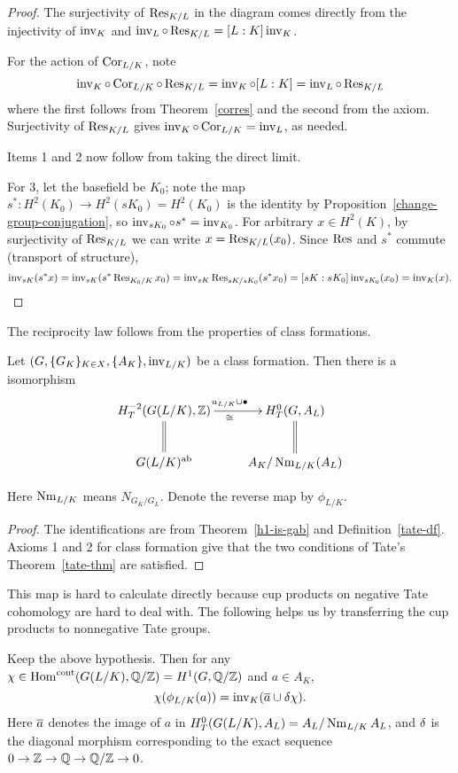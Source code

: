 \begin{proof}
The surjectivity of $\operatorname{Res}_{K/L}$ in the diagram comes directly from the injectivity of $\operatorname{inv}_K$ and $\operatorname{inv}_L\circ \operatorname{Res}_{K/L}=[L:K]\operatorname{inv}_K$.

For the action of $\operatorname{Cor}_{L/K}$, note
\[
\operatorname{inv}_K\circ \operatorname{Cor}_{L/K}\circ\operatorname{Res}_{K/L}=\operatorname{inv}_K\circ[L:K] =\operatorname{inv}_L\circ \operatorname{Res}_{K/L}
\]
where the first follows from Theorem~\ref{corres} and the second from the axiom. Surjectivity of $\operatorname{Res}_{K/L}$ gives $\operatorname{inv}_K\circ \operatorname{Cor}_{L/K}=\operatorname{inv}_L$, as needed.

Items 1 and 2 now follow from taking the direct limit.

For 3, let the basefield be $K_0$; note the map $s^*:H^2(K_0)\to H^2(sK_0)=H^2(K_0)$ is the identity by Proposition~\ref{change-group-conjugation}, so $\operatorname{inv}_{sK_0}\circ s^*=\operatorname{inv}_{K_0}$. For arbitrary $x\in H^2(K)$, by surjectivity of $\operatorname{Res}_{K/L}$ we can write $x=\operatorname{Res}_{K/L}(x_0)$. Since $\operatorname{Res}$ and $s^*$ commute (transport of structure),
\[
\operatorname{inv}_{sK}(s^*x)=\operatorname{inv}_{sK} (s^*\operatorname{Res}_{K_0/K}x_0)
=\operatorname{inv}_{sK} \operatorname{Res}_{sK/sK_0}(s^*x_0)
=[sK:sK_0] \operatorname{inv}_{sK_0}(x_0)=\operatorname{inv}_K(x).
\]
\end{proof}
The reciprocity law follows from the properties of class formations.
\begin{thm}
Let $(G, \{G_K\}_{K\in X}, \{A_K\},\operatorname{inv}_{L/K})$ be a class formation. Then there is a isomorphism
\[
\xymatrix{
H_T^{-2}(G(L/K),\Z)\ar[r]^{u_{L/K}\cup \bullet}_{\cong}\ar@{=}[d] & H_T^0(G,A_L)\ar@{=}[d]\\
G(L/K)^\text{ab}& A_K/\nm_{L/K}(A_L)}
\]
\end{thm}
Here $\operatorname{Nm}_{L/K}$ means $N_{G_K/G_L}$. Denote the reverse map by $\phi_{L/K}$.
\begin{proof}
The identifications are from Theorem~\ref{h1-is-gab} and Definition~\ref{tate-df}. Axioms 1 and 2 for class formation give that the two conditions of Tate's Theorem~\ref{tate-thm} are satisfied.
\end{proof}
This map is hard to calculate directly because cup products on negative Tate cohomology are hard to deal with. 
The following helps us by transferring the cup products to nonnegative Tate groups.
\begin{thm}
Keep the above hypothesis. Then for any $\chi\in \operatorname{Hom}^{\text{cont}}(G(L/K),\mathbb{Q}/\mathbb{Z})=H^1(G,\mathbb{Q}/\mathbb{Z})$ and $a\in A_K$,
\[
\chi(\phi_{L/K}(a))=\operatorname{inv}_K(\overline{a}\cup \delta \chi).
\]
Here $\overline{a}$ denotes the image of $a$ in $H_T^{0}(G(L/K),A_L)=A_L/\operatorname{Nm}_{L/K}A_L$, and $\delta$ is the diagonal morphism corresponding to the exact sequence $0\to \mathbb{Z}\to \mathbb{Q}\to \mathbb{Q}/\mathbb{Z}\to 0$.
\end{thm}
